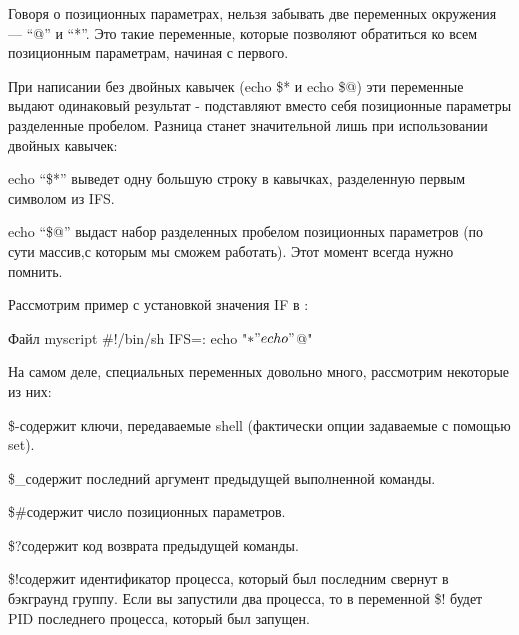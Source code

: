 Говоря о позиционных параметрах, нельзя забывать две переменных окружения ---  “@” и “*”. Это такие переменные, которые  позволяют обратиться ко всем позиционным параметрам, начиная с первого.

При написании без двойных кавычек (echo \$* и echo \$@) эти переменные выдают одинаковый результат - подставляют вместо себя позиционные параметры разделенные пробелом. Разница станет значительной лишь при использовании двойных кавычек:

echo “\$*” 	выведет одну большую строку в кавычках, разделенную первым символом из IFS.
 
echo “\$@” 	    выдаст набор разделенных пробелом позиционных параметров (по сути массив,с которым мы сможем работать). Этот момент всегда нужно помнить. 

Рассмотрим пример с установкой значения IF в :

\begin{shCode}{Файл myscript}
#!/bin/sh
IFS=:
echo "$*"
echo "$@" \end{shCode}


На самом деле, специальных переменных довольно много, рассмотрим некоторые из них:

\begin{myenv}{\$-}{содержит ключи, передаваемые shell (фактически опции задаваемые с помощью set).}
\end{myenv}

\begin{myenv}{\$\_}{содержит последний аргумент предыдущей выполненной команды.}
\end{myenv}

\begin{myenv}{\$\#}{содержит число позиционных параметров.}
\end{myenv}

\begin{myenv}{\$?}{содержит код возврата предыдущей команды.}
\end{myenv}

\begin{myenv}{\$!}{содержит идентификатор процесса, который был последним свернут в бэкграунд группу. Если вы запустили два процесса, то в переменной \$! будет PID последнего процесса, который был запущен.}
\end{myenv}
